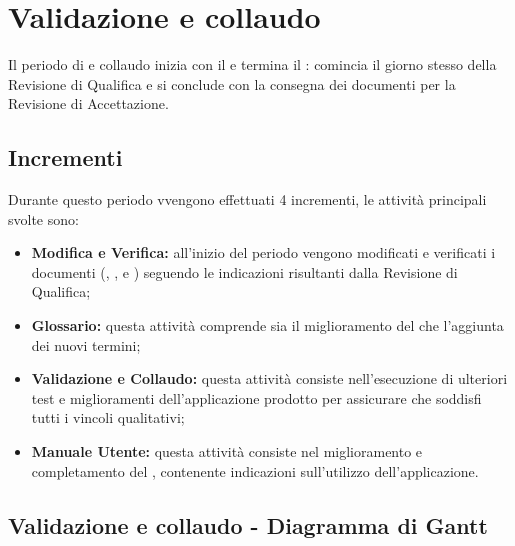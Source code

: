 \documentclass[PianoDiProgetto.tex]{subfiles}
\begin{document}
\section{Validazione e collaudo}
Il periodo di  e collaudo inizia con il  e termina il : comincia il giorno stesso della Revisione di Qualifica e si conclude con la consegna dei documenti per la Revisione di Accettazione.
\subsection{Incrementi}
Durante questo periodo vvengono effettuati 4 incrementi, le attività principali svolte sono:
\begin{itemize}
\item \textbf{Modifica e Verifica:} all'inizio del periodo vengono modificati e verificati  i documenti (\ndp, \pdp, \pdq e \pb) seguendo le indicazioni risultanti dalla Revisione di Qualifica;
\item \textbf{Glossario:} questa attività comprende sia il miglioramento del \g che l'aggiunta dei nuovi termini;
\item \textbf{Validazione e Collaudo:} questa attività consiste nell'esecuzione di ulteriori test e miglioramenti dell'applicazione prodotto per assicurare che soddisfi tutti i vincoli qualitativi;
\item \textbf{Manuale Utente:} questa attività consiste nel miglioramento e completamento del \mut, contenente indicazioni sull'utilizzo dell'applicazione.

\end{itemize}
\begin{landscape}
\subsection{Validazione e collaudo - Diagramma di Gantt}
\end{landscape}	
\end{document}
